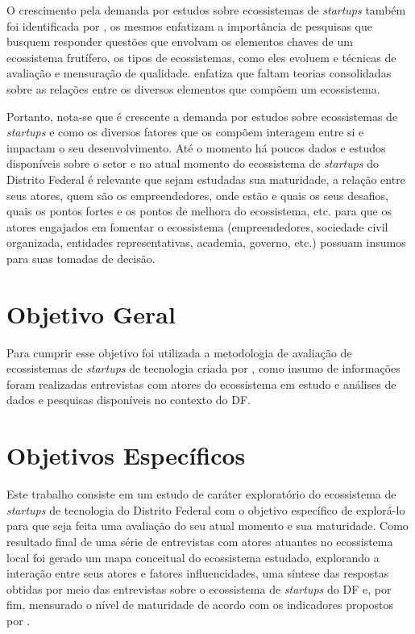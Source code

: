 O crescimento pela demanda por estudos sobre ecossistemas de \textit{startups} também foi identificada por , os mesmos enfatizam a importância de pesquisas que busquem responder questões que envolvam os elementos chaves de um ecossistema frutífero, os tipos de ecossistemas, como eles evoluem e técnicas de avaliação e mensuração de qualidade.  enfatiza que faltam teorias consolidadas sobre as relações entre os diversos elementos que compõem um ecossistema.

Portanto, nota-se que é crescente a demanda por estudos sobre ecossistemas de \textit{startups} e como os diversos fatores que os compõem interagem entre si e impactam o seu desenvolvimento. Até o momento há poucos dados e estudos disponíveis sobre o setor e no atual momento do ecossistema de \textit{startups} do Distrito Federal é relevante que sejam estudadas sua maturidade, a relação entre seus atores, quem são os empreendedores, onde estão e quais os seus desafios, quais os pontos fortes e os pontos de melhora do ecossistema, etc. para que os atores engajados em fomentar o ecossistema (empreendedores, sociedade civil organizada, entidades representativas, academia, governo, etc.) possuam insumos para suas tomadas de decisão. 

\section{Objetivo Geral}
\label{section:objetivo_geral}

Para cumprir esse objetivo foi utilizada a metodologia de avaliação de ecossistemas de \textit{startups} de tecnologia criada por , como insumo de informações foram realizadas entrevistas com atores do ecossistema em estudo e análises de dados e pesquisas disponíveis no contexto do DF.

\section{Objetivos Específicos}
\label{section:objetivos_especificos}

Este trabalho consiste em um estudo de caráter exploratório do ecossistema de \textit{startups} de tecnologia do Distrito Federal com o objetivo específico de explorá-lo para que seja feita uma avaliação do seu atual momento e sua maturidade. Como resultado final de uma série de entrevistas com atores atuantes no ecossistema local foi gerado um mapa conceitual do ecossistema estudado, explorando a interação entre seus atores e fatores influencidades, uma síntese das respostas obtidas por meio das entrevistas sobre o ecossistema de \textit{startups} do DF e, por fim, mensurado o nível de maturidade de acordo com os indicadores propostos por .

